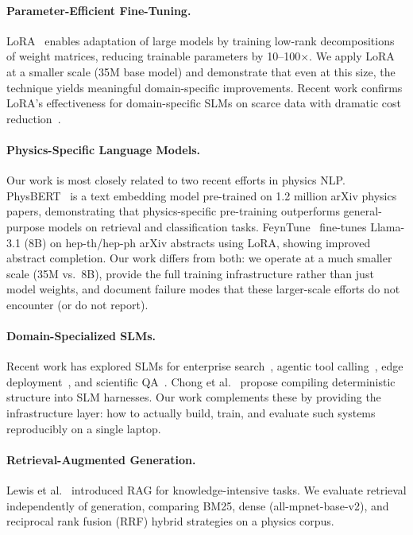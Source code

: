 \documentclass[11pt]{article}
\begin{document}
\paragraph{Parameter-Efficient Fine-Tuning.}
LoRA~\cite{hu2021lora} enables adaptation of large models by training low-rank decompositions of weight matrices, reducing trainable parameters by 10--100$\times$. We apply LoRA at a smaller scale (35M base model) and demonstrate that even at this size, the technique yields meaningful domain-specific improvements. Recent work confirms LoRA's effectiveness for domain-specific SLMs on scarce data with dramatic cost reduction~\cite{lora_cost2026}.

\paragraph{Physics-Specific Language Models.}
Our work is most closely related to two recent efforts in physics NLP. PhysBERT~\cite{physbert2024} is a text embedding model pre-trained on 1.2 million arXiv physics papers, demonstrating that physics-specific pre-training outperforms general-purpose models on retrieval and classification tasks. FeynTune~\cite{feyntune2025} fine-tunes Llama-3.1 (8B) on hep-th/hep-ph arXiv abstracts using LoRA, showing improved abstract completion. Our work differs from both: we operate at a much smaller scale (35M vs.\ 8B), provide the full training infrastructure rather than just model weights, and document failure modes that these larger-scale efforts do not encounter (or do not report).

\paragraph{Domain-Specialized SLMs.}
Recent work has explored SLMs for enterprise search~\cite{kang2026enterprise}, agentic tool calling~\cite{jhandi2025slmtool}, edge deployment~\cite{sacai2025edge}, and scientific QA~\cite{shakti2025}. Chong et al.~\cite{chong2026deterministic} propose compiling deterministic structure into SLM harnesses. Our work complements these by providing the infrastructure layer: how to actually build, train, and evaluate such systems reproducibly on a single laptop.

\paragraph{Retrieval-Augmented Generation.}
Lewis et al.~\cite{lewis2020rag} introduced RAG for knowledge-intensive tasks. We evaluate retrieval independently of generation, comparing BM25, dense (all-mpnet-base-v2), and reciprocal rank fusion (RRF) hybrid strategies on a physics corpus.
\end{document}
